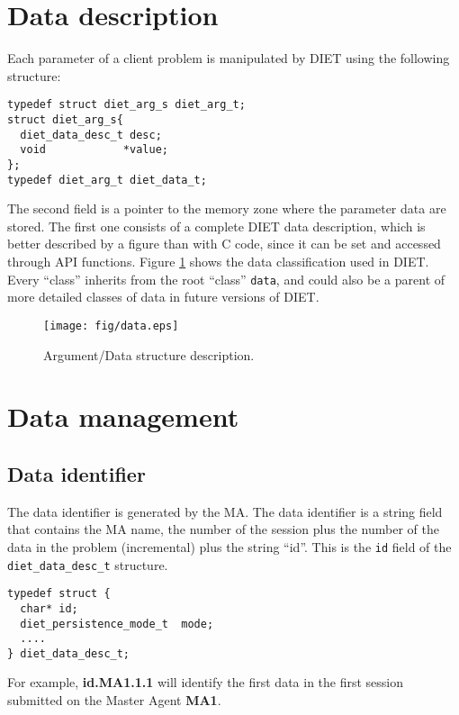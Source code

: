 \section{Data description}
\label{sec:datadesc}

Each parameter of a client problem is manipulated by DIET using the following
structure:
{\footnotesize
\begin{verbatim}
typedef struct diet_arg_s diet_arg_t;
struct diet_arg_s{
  diet_data_desc_t desc;
  void            *value;
};
typedef diet_arg_t diet_data_t;
\end{verbatim}
}

The second field is a pointer to the memory zone where the parameter data are
stored. The first one consists of a complete DIET data description, which is
better described by a figure than with C code, since it can be set and accessed
through API functions. Figure \ref{fig:data} shows the data classification used
in DIET. Every ``class'' inherits from the root ``class'' \texttt{data}, and
could also be a parent of more detailed classes of data in future versions of
DIET.

\begin{figure}[hpt]
 \begin{center}
  \texttt{[image: fig/data.eps]}
  \caption{Argument/Data structure description.}
  \label{fig:data}
 \end{center}
\end{figure}


\section{Data management}
\label{sec:datamgt}

\subsection{Data identifier}
\label{ssec:dataid}
The data identifier is generated by the MA. The data identifier is a
string field that contains the MA name, the number of the session plus
the number of the data in the problem (incremental) plus the string
``id''.  This is the \texttt{id} field of the
\texttt{diet\_data\_desc\_t} structure.

{\footnotesize
\begin{verbatim}
typedef struct {
  char* id;  
  diet_persistence_mode_t  mode;
  ....
} diet_data_desc_t;
\end{verbatim}
}

For example, \textbf{id.MA1.1.1} will identify the first data
in the first session submitted on the Master Agent \textbf{MA1}.


